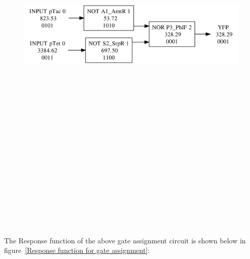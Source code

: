 \documentclass[11pt]{article}
\begin{document}
\begin{figure}[ht!]
\centering
\includegraphics[width=16cm,height=16cm,keepaspectratio]{ex_synthesis.png}
\label{Logic synthesis for AND gate}
\end{figure}
\\[\baselineskip]   
\\[\baselineskip]   
\\[\baselineskip]   
\\[\baselineskip]   
The Response function of the above gate assignment circuit is shown below in figure~\ref{Response function for gate assignment}:
\\[\baselineskip]   
\end{document}
